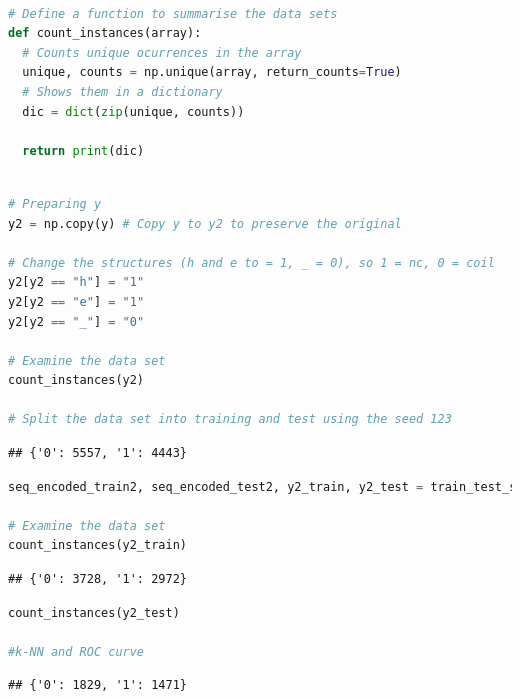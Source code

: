 \documentclass[
]{article}
\begin{document}
\begin{lstlisting}[language=Python]

# Define a function to summarise the data sets
def count_instances(array):
  # Counts unique ocurrences in the array
  unique, counts = np.unique(array, return_counts=True)
  # Shows them in a dictionary
  dic = dict(zip(unique, counts))
  
  return print(dic)
\end{lstlisting}

\begin{lstlisting}[language=Python]

# Preparing y
y2 = np.copy(y) # Copy y to y2 to preserve the original

# Change the structures (h and e to = 1, _ = 0), so 1 = nc, 0 = coil
y2[y2 == "h"] = "1"
y2[y2 == "e"] = "1"
y2[y2 == "_"] = "0"

# Examine the data set
count_instances(y2)

# Split the data set into training and test using the seed 123
\end{lstlisting}

\begin{lstlisting}
## {'0': 5557, '1': 4443}
\end{lstlisting}

\begin{lstlisting}[language=Python]
seq_encoded_train2, seq_encoded_test2, y2_train, y2_test = train_test_split(seq_encoded, y2 ,test_size=0.33,  random_state=123)

# Examine the data set
count_instances(y2_train)
\end{lstlisting}

\begin{lstlisting}
## {'0': 3728, '1': 2972}
\end{lstlisting}

\begin{lstlisting}[language=Python]
count_instances(y2_test)

#k-NN and ROC curve
\end{lstlisting}

\begin{lstlisting}
## {'0': 1829, '1': 1471}
\end{lstlisting}
\end{document}
